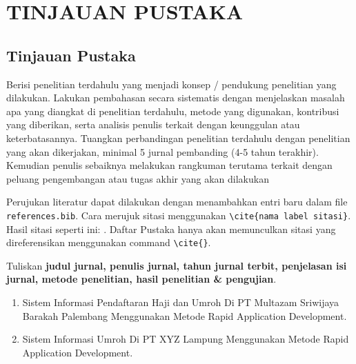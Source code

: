 \newpage
\chapter{TINJAUAN PUSTAKA} \label{Bab II}

\section{Tinjauan Pustaka} \label{II.Tinjauan}
Berisi penelitian terdahulu yang menjadi konsep / pendukung penelitian yang dilakukan. Lakukan pembahasan secara sistematis dengan menjelaskan masalah apa yang diangkat di penelitian terdahulu, metode yang digunakan, kontribusi yang diberikan, serta analisis penulis terkait dengan keunggulan atau keterbatasannya. Tuangkan perbandingan penelitian terdahulu dengan penelitian yang akan dikerjakan, minimal 5 jurnal pembanding (4-5 tahun terakhir). Kemudian penulis sebaiknya melakukan rangkuman terutama terkait dengan peluang pengembangan atau tugas akhir yang akan dilakukan \par

Perujukan literatur dapat dilakukan dengan menambahkan entri baru dalam file \verb|references.bib|. Cara merujuk sitasi menggunakan \verb|\cite{nama label sitasi}|. Hasil sitasi seperti ini: \cite{knuth2001art}. Daftar Pustaka hanya akan memunculkan sitasi yang direferensikan menggunakan command \verb|\cite{}|. \par

Tuliskan \textbf{judul jurnal, penulis jurnal, tahun jurnal terbit, penjelasan isi jurnal, metode penelitian, hasil penelitian \& pengujian}. \par
\begin{enumerate}[noitemsep]
	\item Sistem Informasi Pendaftaran Haji dan Umroh Di PT Multazam Sriwijaya Barakah Palembang Menggunakan Metode Rapid Application Development. \blindtext
	\item Sistem Informasi Umroh Di PT XYZ Lampung Menggunakan Metode Rapid Application Development. \blindtext
\end{enumerate}

